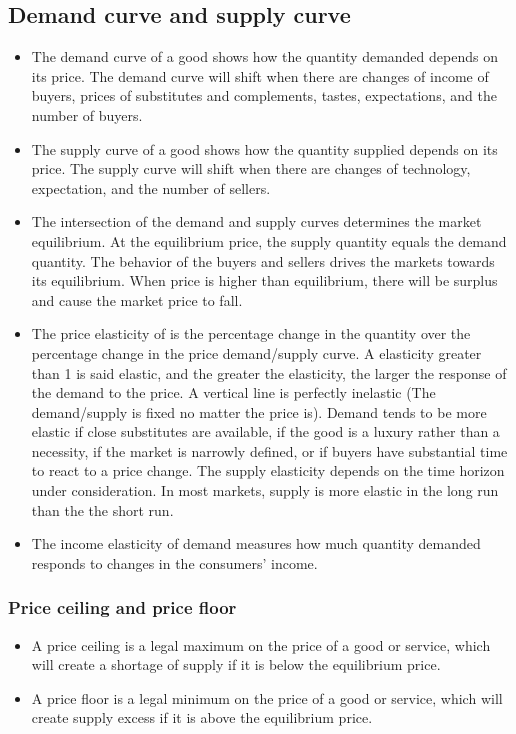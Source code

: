 \documentclass[a4paper,13pt]{report}
\begin{document}
\subsection{Demand curve and supply curve}
\begin{itemize}
    \item The demand curve of a good shows how the quantity demanded depends on its price. The demand curve will shift when there are changes of  income of buyers, prices of substitutes and complements, tastes, expectations, and the number of buyers.
    \item The supply curve of a good shows how the quantity supplied depends on its price. The supply curve will shift when there are changes of technology, expectation, and the number of sellers. 
    \item The intersection of the demand and supply curves determines the market equilibrium. At the equilibrium price, the supply quantity equals the demand quantity. The behavior of the buyers and sellers drives the markets towards its equilibrium. When price is higher than equilibrium, there will be surplus and cause the market price to fall. 
    \item The price elasticity of is the percentage change in the quantity over the percentage change in the price demand/supply curve. A elasticity greater than 1 is said elastic, and the greater the elasticity, the larger the response of the demand to the price. A vertical line is perfectly inelastic (The demand/supply is fixed no matter the price is).  Demand tends to be more elastic if close substitutes are available, if the good is a luxury rather than a necessity, if the market is narrowly defined, or if buyers have substantial time to react to a price change. The supply elasticity depends on the time horizon under consideration. In most markets, supply is more elastic in the long run than the the short run.
    \item The income elasticity of demand measures how much quantity demanded responds to changes in the consumers' income.
\end{itemize}



\subsubsection{Price ceiling and price floor}
\begin{itemize}
    \item A price ceiling is a legal maximum on the price of a good or service, which will create a shortage of supply if it is below the equilibrium price.
    \item  A price floor is a legal minimum on the price of a good or service, which will create supply excess if it is above the equilibrium price. 
\end{itemize}
\end{document}
